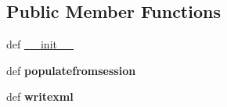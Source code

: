 \subsection*{Public Member Functions}
\begin{DoxyCompactItemize}
\item 
def \hyperlink{classcore_1_1misc_1_1xmlwriter0_1_1_core_document_writer0_a083685c2603e8f6796536eae8d3d5baf}{\+\_\+\+\_\+init\+\_\+\+\_\+}
\item 
\hypertarget{classcore_1_1misc_1_1xmlwriter0_1_1_core_document_writer0_a5d37df058fb858bd1d59be9e9483a591}{def {\bfseries populatefromsession}}\label{classcore_1_1misc_1_1xmlwriter0_1_1_core_document_writer0_a5d37df058fb858bd1d59be9e9483a591}

\item 
\hypertarget{classcore_1_1misc_1_1xmlwriter0_1_1_core_document_writer0_a11bced5e4d5603b87121eee6a759a55f}{def {\bfseries writexml}}\label{classcore_1_1misc_1_1xmlwriter0_1_1_core_document_writer0_a11bced5e4d5603b87121eee6a759a55f}


\end{DoxyCompactItemize}

